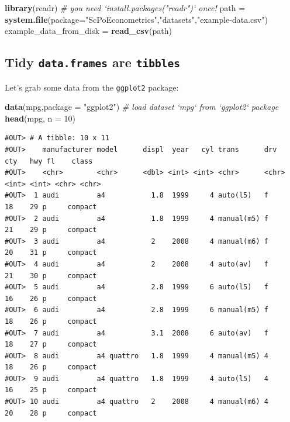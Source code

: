 \documentclass[]{book}
\newenvironment{Shaded}{\begin{snugshade}}{\end{snugshade}}
\newcommand{\CommentTok}[1]{\textcolor[rgb]{0.56,0.35,0.01}{\textit{#1}}}
\newcommand{\DataTypeTok}[1]{\textcolor[rgb]{0.13,0.29,0.53}{#1}}
\newcommand{\DecValTok}[1]{\textcolor[rgb]{0.00,0.00,0.81}{#1}}
\newcommand{\KeywordTok}[1]{\textcolor[rgb]{0.13,0.29,0.53}{\textbf{#1}}}
\newcommand{\NormalTok}[1]{#1}
\newcommand{\StringTok}[1]{\textcolor[rgb]{0.31,0.60,0.02}{#1}}
\begin{document}
\begin{Shaded}
\begin{Highlighting}[]
\KeywordTok{library}\NormalTok{(readr)  }\CommentTok{# you need `install.packages("readr")` once!}
\NormalTok{path =}\StringTok{ }\KeywordTok{system.file}\NormalTok{(}\DataTypeTok{package=}\StringTok{"ScPoEconometrics"}\NormalTok{,}\StringTok{"datasets"}\NormalTok{,}\StringTok{"example-data.csv"}\NormalTok{)}
\NormalTok{example_data_from_disk =}\StringTok{ }\KeywordTok{read_csv}\NormalTok{(path)}
\end{Highlighting}
\end{Shaded}

\hypertarget{tidy-data.frames-are-tibbles}{%
\subsection{\texorpdfstring{Tidy \texttt{data.frames} are \texttt{tibbles}}{Tidy data.frames are tibbles}}\label{tidy-data.frames-are-tibbles}}

Let's grab some data from the \texttt{ggplot2} package:

\begin{Shaded}
\begin{Highlighting}[]
\KeywordTok{data}\NormalTok{(mpg,}\DataTypeTok{package =} \StringTok{"ggplot2"}\NormalTok{)  }\CommentTok{# load dataset `mpg` from `ggplot2` package}
\KeywordTok{head}\NormalTok{(mpg, }\DataTypeTok{n =} \DecValTok{10}\NormalTok{)}
\end{Highlighting}
\end{Shaded}

\begin{verbatim}
#OUT> # A tibble: 10 x 11
#OUT>    manufacturer model      displ  year   cyl trans      drv     cty   hwy fl    class  
#OUT>    <chr>        <chr>      <dbl> <int> <int> <chr>      <chr> <int> <int> <chr> <chr>  
#OUT>  1 audi         a4           1.8  1999     4 auto(l5)   f        18    29 p     compact
#OUT>  2 audi         a4           1.8  1999     4 manual(m5) f        21    29 p     compact
#OUT>  3 audi         a4           2    2008     4 manual(m6) f        20    31 p     compact
#OUT>  4 audi         a4           2    2008     4 auto(av)   f        21    30 p     compact
#OUT>  5 audi         a4           2.8  1999     6 auto(l5)   f        16    26 p     compact
#OUT>  6 audi         a4           2.8  1999     6 manual(m5) f        18    26 p     compact
#OUT>  7 audi         a4           3.1  2008     6 auto(av)   f        18    27 p     compact
#OUT>  8 audi         a4 quattro   1.8  1999     4 manual(m5) 4        18    26 p     compact
#OUT>  9 audi         a4 quattro   1.8  1999     4 auto(l5)   4        16    25 p     compact
#OUT> 10 audi         a4 quattro   2    2008     4 manual(m6) 4        20    28 p     compact
\end{verbatim}
\end{document}
